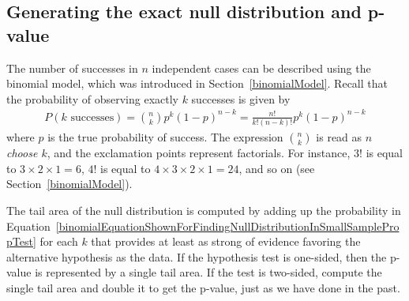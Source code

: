 \subsection{Generating the exact null distribution and p-value}
\label{exactNullDistributionUsingBinomialModel}

The number of successes in $n$ independent cases can be described using the binomial model, which was introduced in Section~\ref{binomialModel}. Recall that the probability of observing exactly $k$ successes is given by
\begin{align} \label{binomialEquationShownForFindingNullDistributionInSmallSamplePropTest}
P(k\text{ successes}) = {n\choose k} p^{k}(1-p)^{n-k} = \frac{n!}{k!(n-k)!} p^{k}(1-p)^{n-k}
\end{align}
where $p$ is the true probability of success. The expression ${n\choose k}$ is read as \emph{$n$ choose $k$}, and the exclamation points represent factorials. For instance, $3!$ is equal to $3\times 2\times 1=6$, $4!$ is equal to $4\times 3\times 2\times 1 = 24$, and so on (see Section~\ref{binomialModel}).

The tail area of the null distribution is computed by adding up the probability in Equation~\eqref{binomialEquationShownForFindingNullDistributionInSmallSamplePropTest} for each $k$ that provides at least as strong of evidence favoring the alternative hypothesis as the data. If the hypothesis test is one-sided, then the p-value is represented by a single tail area. If the test is two-sided, compute the single tail area and double it to get the p-value, just as we have done in the past.

\textC{\pagebreak}

